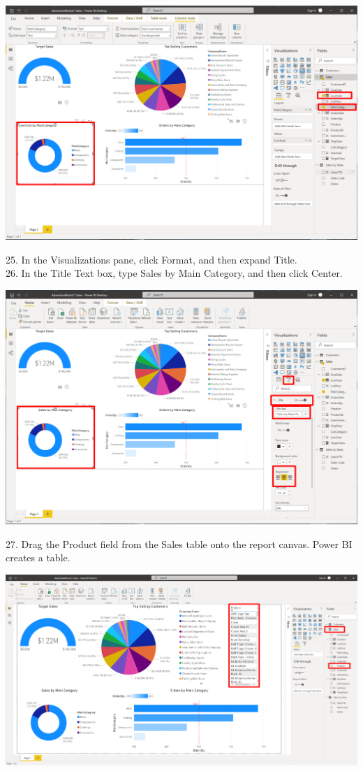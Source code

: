\documentclass[12pt,letterpaper]{article}
\begin{document}
\begin{center}
    \includegraphics[width=15cm]{img/90.png}
    \vspace{1cm}
\end{center}
25. In the Visualizations pane, click Format, and then expand Title.
\\26. In the Title Text box, type Sales by Main Category, and then click Center.
\begin{center}
    \includegraphics[width=17cm]{img/91.png}
    \vspace{1cm}
\end{center}
27. Drag the Product field from the Sales table onto the report canvas. Power BI creates a table.
\begin{center}
    \includegraphics[width=17cm]{img/92.png}
    \vspace{1cm}
\end{center}
\end{document}
